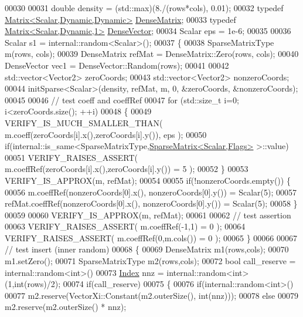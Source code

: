 \begin{DoxyCode}
00030 
00031   \textcolor{keywordtype}{double} density = (std::max)(8./(rows*cols), 0.01);
00032   \textcolor{keyword}{typedef} \hyperlink{group___core___module}{Matrix<Scalar,Dynamic,Dynamic>} 
      \hyperlink{group___core___module}{DenseMatrix};
00033   \textcolor{keyword}{typedef} \hyperlink{group___core___module}{Matrix<Scalar,Dynamic,1>} \hyperlink{group___core___module}{DenseVector};
00034   Scalar eps = 1e-6;
00035 
00036   Scalar s1 = internal::random<Scalar>();
00037   \{
00038     SparseMatrixType m(rows, cols);
00039     DenseMatrix refMat = DenseMatrix::Zero(rows, cols);
00040     DenseVector vec1 = DenseVector::Random(rows);
00041 
00042     std::vector<Vector2> zeroCoords;
00043     std::vector<Vector2> nonzeroCoords;
00044     initSparse<Scalar>(density, refMat, m, 0, &zeroCoords, &nonzeroCoords);
00045 
00046     \textcolor{comment}{// test coeff and coeffRef}
00047     \textcolor{keywordflow}{for} (std::size\_t i=0; i<zeroCoords.size(); ++i)
00048     \{
00049       VERIFY\_IS\_MUCH\_SMALLER\_THAN( m.coeff(zeroCoords[i].x(),zeroCoords[i].y()), eps );
00050       \textcolor{keywordflow}{if}(internal::is\_same<SparseMatrixType,\hyperlink{group___sparse_core___module_class_eigen_1_1_sparse_matrix}{SparseMatrix<Scalar,Flags>} >::value)
00051         VERIFY\_RAISES\_ASSERT( m.coeffRef(zeroCoords[i].x(),zeroCoords[i].y()) = 5 );
00052     \}
00053     VERIFY\_IS\_APPROX(m, refMat);
00054 
00055     \textcolor{keywordflow}{if}(!nonzeroCoords.empty()) \{
00056       m.coeffRef(nonzeroCoords[0].x(), nonzeroCoords[0].y()) = Scalar(5);
00057       refMat.coeffRef(nonzeroCoords[0].x(), nonzeroCoords[0].y()) = Scalar(5);
00058     \}
00059 
00060     VERIFY\_IS\_APPROX(m, refMat);
00061 
00062       \textcolor{comment}{// test assertion}
00063       VERIFY\_RAISES\_ASSERT( m.coeffRef(-1,1) = 0 );
00064       VERIFY\_RAISES\_ASSERT( m.coeffRef(0,m.cols()) = 0 );
00065     \}
00066 
00067     \textcolor{comment}{// test insert (inner random)}
00068     \{
00069       DenseMatrix m1(rows,cols);
00070       m1.setZero();
00071       SparseMatrixType m2(rows,cols);
00072       \textcolor{keywordtype}{bool} call\_reserve = internal::random<int>()%
00073       \hyperlink{namespace_eigen_a62e77e0933482dafde8fe197d9a2cfde}{Index} nnz = internal::random<int>(1,int(rows)/2);
00074       \textcolor{keywordflow}{if}(call\_reserve)
00075       \{
00076         \textcolor{keywordflow}{if}(internal::random<int>()%
00077           m2.reserve(VectorXi::Constant(m2.outerSize(), int(nnz)));
00078         \textcolor{keywordflow}{else}
00079           m2.reserve(m2.outerSize() * nnz);

\end{DoxyCode}

